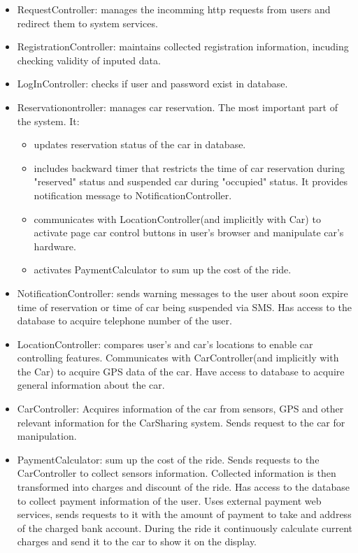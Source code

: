 \documentclass[12pt, letterpaper]{article}
\begin{document}
\begin{itemize}
	\item RequestController: manages the incomming http requests from users and redirect them to system services.
	\item RegistrationController: maintains collected registration information, incuding checking validity of inputed data. 
	\item LogInController: checks if user and password exist in database. 
	\item Reservationontroller: manages car reservation. The most important part of the system. It: 
	\begin{itemize}
	   	\item updates reservation status of the car in database.
	   	\item includes backward timer that restricts the time of car reservation during "reserved" status and suspended car during "occupied" status. It provides notification message to NotificationController.  
	   	\item communicates with LocationController(and implicitly with Car) to activate page car control buttons in user's browser and manipulate car's hardware.
	   	\item activates PaymentCalculator to sum up the cost of the ride. 
	\end{itemize}   
	\item NotificationController: sends warning messages to the user about soon expire time of reservation or time of car being suspended via SMS. Has access to the database to acquire telephone number of the user.
	\item LocationController: compares user's and car's locations to enable car controlling features. Communicates with CarController(and implicitly with the Car) to acquire GPS data of the car. Have access to database to acquire general information about the car.  
	\item CarController: Acquires information of the car from sensors, GPS and other relevant information for the CarSharing system. Sends request to the car for manipulation. 
	\item PaymentCalculator: sum up the cost of the ride. Sends requests to the CarController to collect sensors information. Collected information is then transformed into charges and discount of the ride. Has access to the database to collect payment information of the user. Uses external payment web services, sends requests to it with the amount of payment to take and address of the charged bank account. During the ride it continuously calculate current charges and send it to the car to show it on the display.
\end{itemize}
\end{document}

